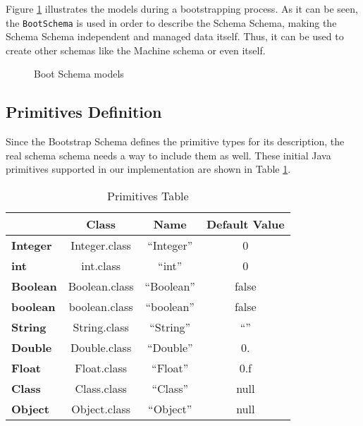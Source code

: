 Figure \ref{fig:schema_schema_models} illustrates the models during a bootstrapping process.
As it can be seen, the \texttt{BootSchema} is used in order to describe the Schema Schema, making the Schema Schema independent and managed data itself.
Thus, it can be used to create other schemas like the Machine schema or even itself.

\begin{figure}[H]
	\centering
  	\caption{Boot Schema models}
  	\label{fig:schema_schema_models}
\end{figure}

\subsection{Primitives Definition}\label{Primitives Definition}
Since the Bootstrap Schema defines the primitive types for its description, the real schema schema needs a way to include them as well.
These initial Java primitives supported in our implementation are shown in Table \ref{tbl:primivites_table}.

\begin{table}[H]
	\centering
	\begin{tabular}{@{}lccc@{}}
	\toprule
	                 & \textbf{Class} & \textbf{Name} & \textbf{Default Value} \\ \midrule
	\textbf{Integer} & Integer.class  & ``Integer''   & 0                      \\
	\textbf{int}     & int.class      & ``int''       & 0                      \\
	\textbf{Boolean} & Boolean.class  & ``Boolean''   & false                  \\
	\textbf{boolean} & boolean.class  & ``boolean''   & false                  \\
	\textbf{String}  & String.class   & ``String''    & ``''                   \\
	\textbf{Double}  & Double.class   & ``Double''    & 0.                     \\
	\textbf{Float}   & Float.class    & ``Float''     & 0.f                    \\
	\textbf{Class}   & Class.class    & ``Class''     & null                   \\
	\textbf{Object}  & Object.class   & ``Object''    & null                   \\ \bottomrule
	\end{tabular}
	\caption{Primitives Table}
	\label{tbl:primivites_table}
\end{table}

